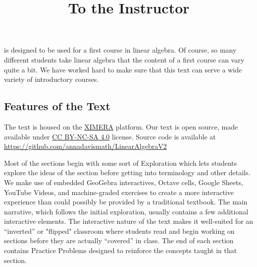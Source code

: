 \documentclass{ximera}
\title{To the Instructor} \license{CC BY-NC-SA 4.0}
\begin{document}
\begin{abstract}
\end{abstract}
\maketitle

 is designed to be used for a first course in linear algebra.  Of course, so many different students take linear algebra that the content of a first course can vary quite a bit.  We have worked hard to make sure that this text can serve a wide variety of introductory courses. 

\subsection{Features of the Text}

The text is housed on the \href{https://ximera.osu.edu/}{XIMERA} platform. %
Our text is open source, made available under \href{https://creativecommons.org/licenses/by-sa/4.0/deed.en}{CC BY-NC-SA 4.0} license.  Source code is available at \href{https://github.com/annadavismath/LinearAlgebraV2}{https://github.com/annadavismath/LinearAlgebraV2}

Most of the sections begin with some sort of Exploration which lets students explore the ideas of the section before getting into terminology and other details.  We make use of embedded GeoGebra interactives, Octave cells, Google Sheets, YouTube Videos, and machine-graded exercises to create a more interactive experience than could possibly be provided by a traditional textbook.  The main narrative, which follows the initial exploration, usually contains a few additional interactive elements.  The interactive nature of the text %
makes it well-suited for an ``inverted'' or "flipped" classroom where students read and begin working on sections before they are actually ``covered'' in class.  The end of each section contains Practice Problems designed to reinforce the concepts taught in that section.
\end{document}
